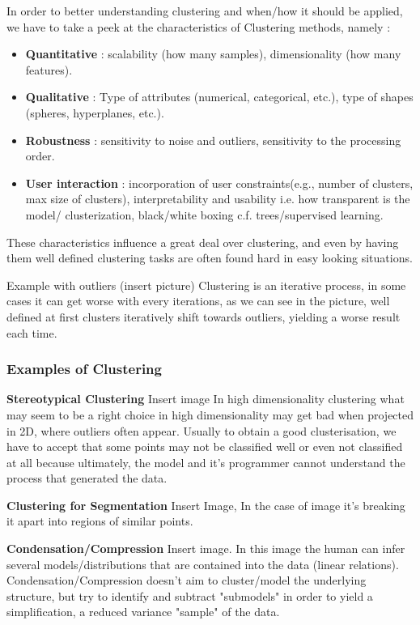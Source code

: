 In order to better understanding clustering and when/how it should be applied, we have to take a peek at the characteristics of Clustering methods, namely :
\begin{itemize}
	\item \textbf{Quantitative} : scalability (how many samples), dimensionality (how many features).
	\item \textbf{Qualitative} : Type of attributes (numerical, categorical, etc.), type of shapes (spheres, hyperplanes, etc.).
	\item \textbf{Robustness} : sensitivity to noise and outliers, sensitivity to the processing order.
	\item \textbf{User interaction} : incorporation of user constraints(e.g., number of clusters, max size of clusters), interpretability and usability i.e. how transparent is the model/ clusterization, black/white boxing c.f. trees/supervised learning.
\end{itemize}

These characteristics influence a great deal over clustering, and even by having them well defined clustering tasks are often found hard in easy looking situations.

Example with outliers (insert picture) Clustering is an iterative process, in some cases it can get worse with every iterations, as we can see in the picture, well defined at first clusters iteratively shift towards outliers, yielding a worse result each time.

\subsubsection{Examples of Clustering}


\textbf{Stereotypical Clustering}
Insert image
In high dimensionality clustering what may seem to be a right choice in high dimensionality may get bad when projected in 2D, where outliers often appear. Usually to obtain a good clusterisation, we have to accept that some points may not be classified well or even not classified at all because ultimately, the model and it's programmer cannot understand the process that generated the data.

\textbf{Clustering for Segmentation}
Insert Image, In the case of image it's breaking it apart into regions of similar points.

\textbf{Condensation/Compression} Insert image. In this image the human can infer several models/distributions that are contained into the data (linear relations). Condensation/Compression doesn't aim to cluster/model the underlying structure, but try to identify and subtract "submodels" in order to yield a simplification, a reduced variance "sample" of the data.

